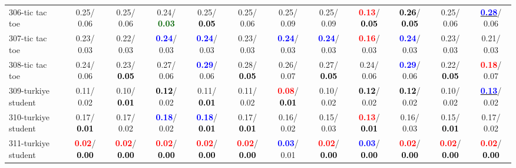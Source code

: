 \begin{table}[h]
\begin{center}
{\begin{tabular}{lc|c|c|c|c|c|c|c|c|c|c}
306-tic tac toe &   0.25/  0.06 &   0.25/  0.06 &   0.24/\textcolor{darkgreen}{\textbf{  0.03}} &   0.25/\textcolor{black}{\textbf{  0.05}} &   0.25/  0.06 &   0.25/  0.09 &   0.25/  0.09 & \textcolor{red}{\textbf{  0.13}}/\textcolor{black}{\textbf{  0.05}} & \textcolor{black}{\textbf{  0.26}}/\textcolor{black}{\textbf{  0.05}} &   0.25/  0.06 & \underline{\textcolor{blue}{\textbf{  0.28}}}/  0.06 \\
307-tic tac toe &   0.23/  0.03 &   0.22/  0.03 & \textcolor{blue}{\textbf{  0.24}}/  0.03 & \textcolor{blue}{\textbf{  0.24}}/  0.03 &   0.23/  0.03 & \textcolor{blue}{\textbf{  0.24}}/  0.03 & \textcolor{blue}{\textbf{  0.24}}/  0.03 & \textcolor{red}{\textbf{  0.16}}/  0.03 & \textcolor{blue}{\textbf{  0.24}}/  0.03 &   0.23/  0.03 &   0.21/  0.03 \\
308-tic tac toe &   0.24/  0.06 &   0.23/\textcolor{black}{\textbf{  0.05}} &   0.27/  0.06 & \textcolor{blue}{\textbf{  0.29}}/  0.06 &   0.28/\textcolor{black}{\textbf{  0.05}} &   0.26/  0.07 &   0.27/\textcolor{black}{\textbf{  0.05}} &   0.24/  0.06 & \textcolor{blue}{\textbf{  0.29}}/  0.06 &   0.22/\textcolor{black}{\textbf{  0.05}} & \textcolor{red}{\textbf{  0.18}}/  0.07 \\
309-turkiye student &   0.11/  0.02 &   0.10/\textcolor{black}{\textbf{  0.01}} & \textcolor{black}{\textbf{  0.12}}/  0.02 &   0.11/\textcolor{black}{\textbf{  0.01}} &   0.11/  0.02 & \textcolor{red}{\textbf{  0.08}}/\textcolor{black}{\textbf{  0.01}} &   0.10/  0.02 & \textcolor{black}{\textbf{  0.12}}/  0.02 & \textcolor{black}{\textbf{  0.12}}/  0.02 &   0.10/  0.02 & \underline{\textcolor{blue}{\textbf{  0.13}}}/  0.02 \\ \hline
310-turkiye student &   0.17/\textcolor{black}{\textbf{  0.01}} &   0.17/  0.02 & \textcolor{blue}{\textbf{  0.18}}/  0.02 & \textcolor{blue}{\textbf{  0.18}}/\textcolor{black}{\textbf{  0.01}} &   0.17/\textcolor{black}{\textbf{  0.01}} &   0.16/  0.02 &   0.15/  0.03 & \textcolor{red}{\textbf{  0.13}}/\textcolor{black}{\textbf{  0.01}} &   0.16/  0.03 &   0.15/\textcolor{black}{\textbf{  0.01}} &   0.17/  0.02 \\
311-turkiye student & \textcolor{red}{\textbf{  0.02}}/\textcolor{black}{\textbf{  0.00}} & \textcolor{red}{\textbf{  0.02}}/\textcolor{black}{\textbf{  0.00}} & \textcolor{red}{\textbf{  0.02}}/\textcolor{black}{\textbf{  0.00}} & \textcolor{red}{\textbf{  0.02}}/\textcolor{black}{\textbf{  0.00}} & \textcolor{red}{\textbf{  0.02}}/\textcolor{black}{\textbf{  0.00}} & \textcolor{blue}{\textbf{  0.03}}/  0.01 & \textcolor{red}{\textbf{  0.02}}/\textcolor{black}{\textbf{  0.00}} & \textcolor{blue}{\textbf{  0.03}}/\textcolor{black}{\textbf{  0.00}} & \textcolor{red}{\textbf{  0.02}}/\textcolor{black}{\textbf{  0.00}} & \textcolor{red}{\textbf{  0.02}}/\textcolor{black}{\textbf{  0.00}} & \textcolor{red}{\textbf{  0.02}}/\textcolor{black}{\textbf{  0.00}} \\

\end{tabular}}
\end{center}
\end{table}
